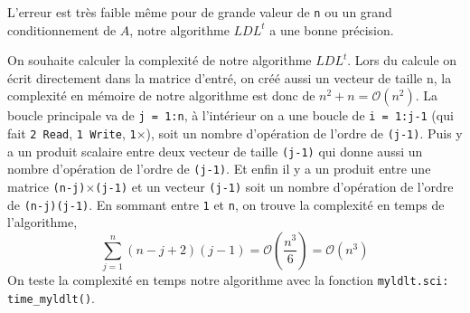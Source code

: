 \documentclass{article}
\begin{document}
L'erreur est très faible même pour de grande valeur de \texttt{n} ou un grand conditionnement de \(A\), notre algorithme \(LDL^t\) a une bonne précision.\newline\indent

On souhaite calculer la complexité de notre algorithme \(LDL^t\).\newline
Lors du calcule on écrit directement dans la matrice d'entré, on créé aussi un vecteur de taille n, la complexité en mémoire de notre algorithme est donc de \(n^2+n = \mathcal{O}(n^2)\).\newline
La boucle principale va de \texttt{j = 1:n}, à l'intérieur on a une boucle de \texttt{i = 1:j-1} (qui fait \texttt{2 Read}, \texttt{1 Write}, \texttt{1}\(\times\)), soit un nombre d'opération de l'ordre de \texttt{(j-1)}.\newline
Puis y a un produit scalaire entre deux vecteur de taille \texttt{(j-1)} qui donne aussi un nombre d'opération de l'ordre de \texttt{(j-1)}. \newline
Et enfin il y a un produit entre une matrice \texttt{(n-j)}\(\times\)\texttt{(j-1)} et un vecteur \texttt{(j-1)} soit un nombre d'opération de l'ordre de \texttt{(n-j)(j-1)}.\newline
En sommant entre \texttt{1} et \texttt{n}, on trouve la complexité en temps de l'algorithme,
\[
\sum_{j=1}^n (n-j+2)(j-1) = \mathcal{O}(\frac{n^3}{6}) = \mathcal{O}(n^3)
\]
On teste la complexité en temps notre algorithme avec la fonction \texttt{myldlt.sci: time\_myldlt()}.
\end{document}

